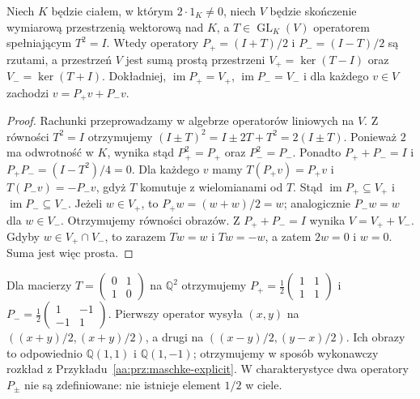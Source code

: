\begin{stwierdzenie}
\label{aa:prop:involution-projectors}
Niech $K$ będzie ciałem, w którym $2\cdot1_K\ne0$, niech
$V$ będzie skończenie wymiarową przestrzenią wektorową nad $K$,
a $T\in\operatorname{GL}_K(V)$ operatorem spełniającym $T^2=I$.
Wtedy operatory $P_+=(I+T)/2$ i $P_-=(I-T)/2$ są rzutami,
a przestrzeń $V$ jest sumą prostą przestrzeni
$V_+=\ker(T-I)$ oraz $V_-=\ker(T+I)$.
Dokładniej, $\operatorname{im}P_+=V_+$,
$\operatorname{im}P_-=V_-$ i dla każdego $v\in V$ zachodzi
$v=P_+v+P_-v$.
\end{stwierdzenie}
\begin{proof}
Rachunki przeprowadzamy w algebrze operatorów liniowych
na $V$. Z równości $T^2=I$ otrzymujemy
$(I\pm T)^2=I\pm2T+T^2=2(I\pm T)$.
Ponieważ $2$ ma odwrotność w $K$, wynika stąd
$P_+^2=P_+$ oraz $P_-^2=P_-$.
Ponadto $P_++P_-=I$ i
$P_+P_-=(I-T^2)/4=0$.
Dla każdego $v$ mamy $T(P_+v)=P_+v$ i
$T(P_-v)=-P_-v$, gdyż $T$ komutuje z wielomianami od $T$.
Stąd $\operatorname{im}P_+\subseteq V_+$ i
$\operatorname{im}P_-\subseteq V_-$.
Jeżeli $w\in V_+$, to $P_+w=(w+w)/2=w$;
analogicznie $P_-w=w$ dla $w\in V_-$.
Otrzymujemy równości obrazów.
Z $P_++P_-=I$ wynika $V=V_++V_-$.
Gdyby $w\in V_+\cap V_-$, to zarazem $Tw=w$ i
$Tw=-w$, a zatem $2w=0$ i $w=0$.
Suma jest więc prosta.
\end{proof}
\begin{przyklad}
\label{aa:prz:involution-projectors}
Dla macierzy $T=\begin{pmatrix}0&1\\1&0\end{pmatrix}$
na $\mathbb Q^2$ otrzymujemy
$P_+=\tfrac12\begin{pmatrix}1&1\\1&1\end{pmatrix}$ i
$P_-=\tfrac12\begin{pmatrix}1&-1\\-1&1\end{pmatrix}$.
Pierwszy operator wysyła $(x,y)$ na
$((x+y)/2,(x+y)/2)$, a drugi na
$((x-y)/2,(y-x)/2)$.
Ich obrazy to odpowiednio $\mathbb Q(1,1)$ i
$\mathbb Q(1,-1)$; otrzymujemy w sposób wykonawczy
rozkład z Przykładu~\ref{aa:prz:maschke-explicit}.
W charakterystyce dwa operatory $P_\pm$ nie są
zdefiniowane: nie istnieje element $1/2$ w ciele.
\end{przyklad}

